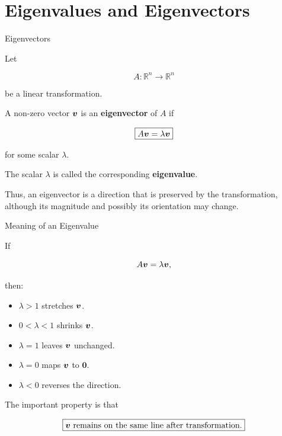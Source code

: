

\section{Eigenvalues and Eigenvectors}


\begin{frame}{Eigenvectors}

Let

\[
A:\mathbb{R}^n\rightarrow\mathbb{R}^n
\]

be a linear transformation.

A non-zero vector $\bm{v}$ is an \textbf{eigenvector} of $A$
if

\[
\boxed{
A\bm{v}=\lambda\bm{v}
}
\]

for some scalar $\lambda$.

The scalar $\lambda$ is called the corresponding
\textbf{eigenvalue}.

\vspace{0.4cm}

Thus, an eigenvector is a direction that is preserved by
the transformation, although its magnitude and possibly
its orientation may change.

\end{frame}



\begin{frame}{Meaning of an Eigenvalue}

If

\[
A\bm{v}=\lambda\bm{v},
\]

then:

\begin{itemize}
    \item $\lambda>1$ stretches $\bm{v}$.
    \item $0<\lambda<1$ shrinks $\bm{v}$.
    \item $\lambda=1$ leaves $\bm{v}$ unchanged.
    \item $\lambda=0$ maps $\bm{v}$ to $\mathbf{0}$.
    \item $\lambda<0$ reverses the direction.
\end{itemize}

\vspace{0.3cm}

The important property is that

\[
\boxed{
\bm{v}\text{ remains on the same line after transformation.}
}
\]

\end{frame}


